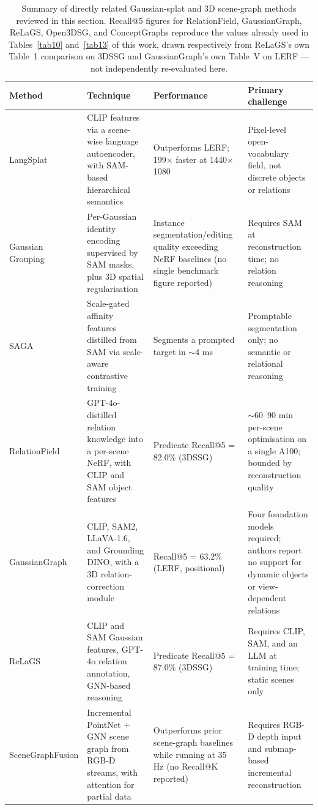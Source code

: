 \documentclass[sn-mathphys,Numbered]{sn-jnl}
\begin{document}
\begin{table}[htbp]
\centering
\caption{Summary of directly related Gaussian-splat and 3D scene-graph methods reviewed in this section. Recall@5 figures for RelationField, GaussianGraph, ReLaGS, Open3DSG, and ConceptGraphs reproduce the values already used in Tables~\ref{tab10} and~\ref{tab13} of this work, drawn respectively from ReLaGS's own Table~1 comparison on 3DSSG and GaussianGraph's own Table~V on LERF --- not independently re-evaluated here.}\label{tab1}
\small
\begin{tabular}{@{}p{2.1cm}p{3.8cm}p{1.9cm}p{3.5cm}@{}}
\toprule
Method & Technique & Performance & Primary challenge \\
\midrule
LangSplat \cite{qin2024langsplat} & CLIP features via a scene-wise language autoencoder, with SAM-based hierarchical semantics & Outperforms LERF; 199$\times$ faster at 1440$\times$1080 & Pixel-level open-vocabulary field, not discrete objects or relations \\
\midrule
Gaussian Grouping \cite{ye2024gaussiangrouping} & Per-Gaussian identity encoding supervised by SAM masks, plus 3D spatial regularisation & Instance segmentation/editing quality exceeding NeRF baselines (no single benchmark figure reported) & Requires SAM at reconstruction time; no relation reasoning \\
\midrule
SAGA \cite{cen2025saga} & Scale-gated affinity features distilled from SAM via scale-aware contrastive training & Segments a prompted target in $\sim$4 ms & Promptable segmentation only; no semantic or relational reasoning \\
\midrule
RelationField \cite{koch2025relationfield} & GPT-4o-distilled relation knowledge into a per-scene NeRF, with CLIP and SAM object features & Predicate Recall@5 = 82.0\% (3DSSG) & $\sim$60--90 min per-scene optimisation on a single A100; bounded by reconstruction quality \\
\midrule
GaussianGraph \cite{wang2025gaussiangraph} & CLIP, SAM2, LLaVA-1.6, and Grounding DINO, with a 3D relation-correction module & Recall@5 = 63.2\% (LERF, positional) & Four foundation models required; authors report no support for dynamic objects or view-dependent relations \\
\midrule
ReLaGS \cite{xie2026relags} & CLIP and SAM Gaussian features, GPT-4o relation annotation, GNN-based reasoning & Predicate Recall@5 = 87.0\% (3DSSG) & Requires CLIP, SAM, and an LLM at training time; static scenes only \\
\midrule
SceneGraphFusion \cite{wu2021scenegraphfusion} & Incremental PointNet + GNN scene graph from RGB-D streams, with attention for partial data & Outperforms prior scene-graph baselines while running at 35 Hz (no Recall@K reported) & Requires RGB-D depth input and submap-based incremental reconstruction \\

\end{tabular}
\end{table}
\end{document}
